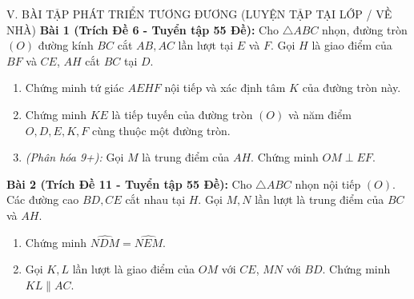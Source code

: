 \documentclass[11pt,a4paper]{article}
\begin{document}
\vspace{2mm}

\begin{exercisebox}{V. BÀI TẬP PHÁT TRIỂN TƯƠNG ĐƯƠNG (LUYỆN TẬP TẠI LỚP / VỀ NHÀ)}
\textbf{Bài 1 (Trích Đề 6 - Tuyển tập 55 Đề):} Cho $\triangle ABC$ nhọn, đường tròn $(O)$ đường kính $BC$ cắt $AB, AC$ lần lượt tại $E$ và $F$. Gọi $H$ là giao điểm của $BF$ và $CE$, $AH$ cắt $BC$ tại $D$.
\begin{enumerate}[label=\alph*)]
    \item Chứng minh tứ giác $AEHF$ nội tiếp và xác định tâm $K$ của đường tròn này.
    \item Chứng minh $KE$ là tiếp tuyến của đường tròn $(O)$ và năm điểm $O, D, E, K, F$ cùng thuộc một đường tròn.
    \item \textit{(Phân hóa 9+):} Gọi $M$ là trung điểm của $AH$. Chứng minh $OM \perp EF$.
\end{enumerate}

\vspace{1mm}
\textbf{Bài 2 (Trích Đề 11 - Tuyển tập 55 Đề):} Cho $\triangle ABC$ nhọn nội tiếp $(O)$. Các đường cao $BD, CE$ cắt nhau tại $H$. Gọi $M, N$ lần lượt là trung điểm của $BC$ và $AH$.
\begin{enumerate}[label=\alph*)]
    \item Chứng minh $\widehat{NDM} = \widehat{NEM}$.
    \item Gọi $K, L$ lần lượt là giao điểm của $OM$ với $CE$, $MN$ với $BD$. Chứng minh $KL \parallel AC$.
\end{enumerate}
\end{exercisebox}
\end{document}
